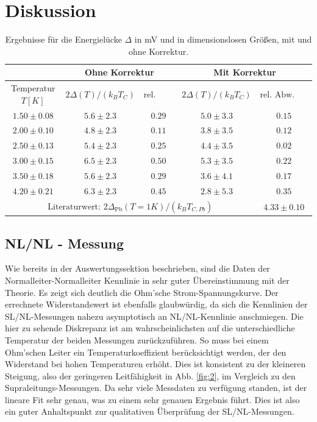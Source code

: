 \documentclass[twoside,        %
               BCOR12mm,       %
               english,ngerman, %
               fleqn,headsepline=false,footsepline=false
              ]{Vorlage/MFPREPORT}
\begin{document}
\section{Diskussion}
\begin{table}
    \centering
    \begin{tabular}{|c|c|c|c|c|}
        \hline
        &\multicolumn{2}{|c|}{Ohne Korrektur}&\multicolumn{2}{|c|}{Mit
        Korrektur}\\\hline
        Temperatur $T [K]$&$2\Delta(T)/(k_BT_C)$&$\text{rel. Abw. zum
        Lit. Wert}$&$2\Delta(T)/(k_BT_C)$&$\text{rel. Abw. zum
        Lit. Wert}$\\\hline
        $1.50\pm0.08$&$5.6\pm2.3$&$0.29$&$5.0\pm3.3$&$0.15$\\\hline
        $2.00\pm0.10$&$4.8\pm2.3$&$0.11$&$3.8\pm3.5$&$0.12$\\\hline
        $2.50\pm0.13$&$5.4\pm2.3$&$0.25$&$4.4\pm3.5$&$0.02$\\\hline
        $3.00\pm0.15$&$6.5\pm2.3$&$0.50$&$5.3\pm3.5$&$0.22$\\\hline
        $3.50\pm0.18$&$5.6\pm2.3$&$0.29$&$3.6\pm4.1$&$0.17$\\\hline
        $4.20\pm0.21$&$6.3\pm2.3$&$0.45$&$2.8\pm5.3$&$0.35$\\\hline\hline
        \multicolumn{4}{|c|}{$\text{Literaturwert: }
        2\Delta_{\text{Pb}}(T=1K)/(k_BT_{C,Pb})$}&$4.33\pm0.10$
        \cite{giaever1961study}\\\hline

    \end{tabular}
    \caption{Ergebnisse für die Energielücke $\Delta$ in mV und in
    dimensionslosen Größen, mit und ohne Korrektur.}
    \label{tab:res2}
\end{table}

\subsection{NL/NL - Messung}
Wie bereits in der Auswertungssektion beschrieben, sind die Daten der
Normalleiter-Normalleiter Kennlinie in sehr guter Übereinstimmung mit der
Theorie. Es zeigt sich deutlich die Ohm'sche Strom-Spannungskurve. Der
errechnete Widerstandswert ist ebenfalls glaubwürdig, da sich die Kennlinien der
SL/NL-Messungen nahezu asymptotisch an NL/NL-Kennlinie anschmiegen. Die hier zu
sehende Diskrepanz ist am wahrscheinlichsten auf die unterschiedliche
Temperatur der beiden Messungen zurückzuführen. So muss bei einem Ohm'schen
Leiter ein Temperaturkoeffizient berücksichtigt werden, der den Widerstand bei
hohen Temperaturen erhöht. Dies ist konsistent zu der kleineren Steigung, also
der geringeren Leitfähigkeit in Abb. \ref{fig:2}, im Vergleich zu den
Supraleitungs-Messungen. 
Da sehr viele Messdaten zu verfügung standen, ist der lineare Fit sehr genau,
was zu einem sehr genauen Ergebnis führt. Dies ist also ein guter Anhaltspunkt
zur qualitativen Überprüfung der SL/NL-Messungen.
\end{document}

